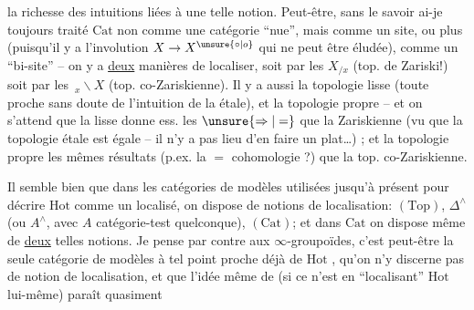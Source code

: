 
 la richesse des intuitions liées à une telle notion. Peut-être, sans le savoir ai-je toujours traité $\mathrm{Cat}$ non comme une catégorie ``nue'', mais comme un site, ou plus  (puisqu'il y a l'involution $X\to X^{\unsure{\circ|o}}$ qui ne peut être éludée), comme un ``bi-site'' -- on y a \uline{deux} manières de localiser,  soit par les $X_{/x}$ (top. de Zariski!) soit par les $\,{}_x\backslash X$ (top. co-Zariskienne). Il y a aussi la topologie lisse (toute proche sans doute de l'intuition de la  étale), et la topologie propre -- et on s'attend que la lisse donne ess. les $\unsure{\Rightarrow|=}$  que la Zariskienne  (vu que la topologie étale  est égale -- il n'y a pas lieu d'en faire un plat\ldots) ; et la topologie propre les mêmes résultats (p.ex. la $=$ cohomologie ?) que la top. co-Zariskienne.

Il semble bien que dans  les catégories de modèles utilisées jusqu'à présent pour décrire $\mathrm{Hot}$ comme un localisé, on dispose de notions de localisation: $(\mathrm{Top})$, $\Delta^\wedge$ (ou $A^\wedge$, avec $A$ catégorie-test quelconque), $(\mathrm{Cat})$; et dans $\mathrm{Cat}$ on dispose même de \uline{deux} telles notions. Je pense par contre aux $\infty$-groupoïdes, c'est peut-être la seule catégorie de modèles à tel point proche déjà de $\mathrm{Hot}$ , qu'on n'y discerne pas de notion de localisation, et que l'idée même de   (si ce n'est en ``localisant'' $\mathrm{Hot}$ lui-même) paraît quasiment

